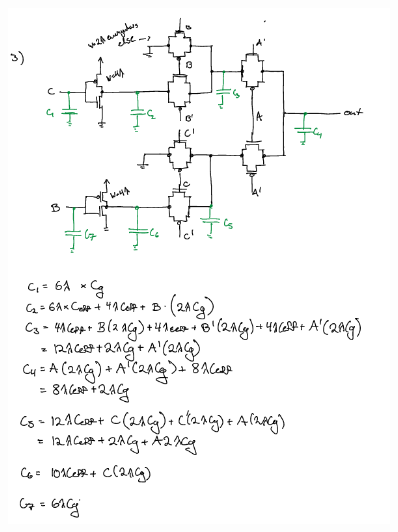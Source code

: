 \documentclass[11pt]{article}
\begin{document}
\begin{figure}[H]
    \centering
\includegraphics[width=0.9\textwidth]{3a.png}
\end{figure}
\end{document}
